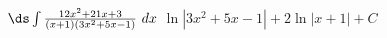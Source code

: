 {$\ds \int \frac{12x^2+21x+3}{(x+1)(3x^2+5x-1)}\ dx$}
{$\ln \left|3 x^2+5 x-1\right|+2 \ln |x+1|+C$}
